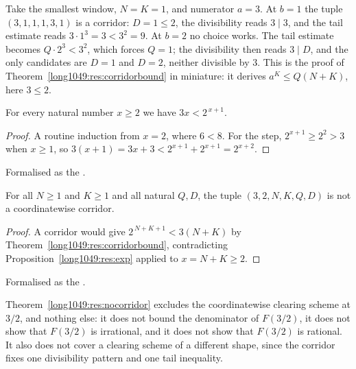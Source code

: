 \documentclass[11pt]{article}
\begin{document}
\begin{example}\label{long1049:ex:corridor}
Take the smallest window, $N=K=1$, and numerator $a=3$.  At $b=1$ the tuple
$(3,1,1,1,3,1)$ is a corridor: $D=1\le2$, the divisibility reads $3\mid3$, and
the tail estimate reads $3\cdot1^{3}=3<3^{2}=9$.  At $b=2$ no choice works.  The
tail estimate becomes $Q\cdot2^{3}<3^{2}$, which forces $Q=1$; the divisibility
then reads $3\mid D$, and the only candidates are $D=1$ and $D=2$, neither
divisible by $3$.  This is the proof of
Theorem~\ref{long1049:res:corridorbound} in miniature: it derives $a^{K}\le Q(N+K)$,
here $3\le2$.
\end{example}

\begin{proposition}\label{long1049:res:exp}
For every natural number $x\ge2$ we have $3x<2^{\,x+1}$.
\end{proposition}

\begin{proof}
A routine induction from $x=2$, where $6<8$.  For the step, $2^{x+1}\ge2^{2}>3$ when
$x\ge1$, so $3(x+1)=3x+3<2^{x+1}+2^{x+1}=2^{x+2}$.
\end{proof}

\noindent Formalised as the
.

\begin{theorem}\label{long1049:res:nocorridor}
For all $N\ge1$ and $K\ge1$ and all natural $Q,D$, the tuple
$(3,2,N,K,Q,D)$ is not a coordinatewise corridor.
\end{theorem}

\begin{proof}
A corridor would give $2^{\,N+K+1}<3(N+K)$ by
Theorem~\ref{long1049:res:corridorbound}, contradicting Proposition~\ref{long1049:res:exp}
applied to $x=N+K\ge2$.
\end{proof}

\noindent Formalised as the
.

Theorem~\ref{long1049:res:nocorridor} excludes the coordinatewise clearing scheme at
$3/2$, and nothing else: it does not bound the denominator of $F(3/2)$, it does
not show that $F(3/2)$ is irrational, and it does not show that $F(3/2)$ is
rational.  It also does not cover a clearing scheme of a different shape, since
the corridor fixes one divisibility pattern and one tail inequality.
\end{document}
